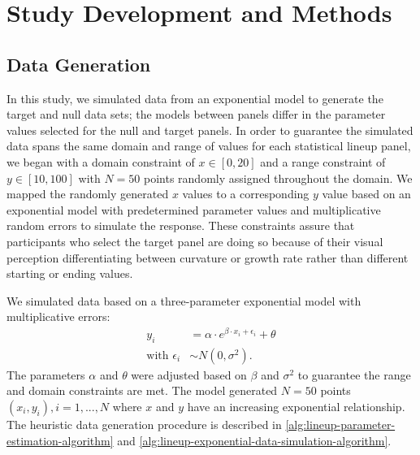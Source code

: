 \documentclass[12pt]{article}
\begin{document}
\hypertarget{methods}{%
\section{Study Development and Methods}\label{methods}}

\hypertarget{data-generation}{%
\subsection{Data Generation}\label{data-generation}}

In this study, we simulated data from an exponential model to generate
the target and null data sets; the models between panels differ in the
parameter values selected for the null and target panels. In order to
guarantee the simulated data spans the same domain and range of values
for each statistical lineup panel, we began with a domain constraint of
\(x\in [0,20]\) and a range constraint of \(y\in [10,100]\) with
\(N = 50\) points randomly assigned throughout the domain. We mapped the
randomly generated \(x\) values to a corresponding \(y\) value based on
an exponential model with predetermined parameter values and
multiplicative random errors to simulate the response. These constraints
assure that participants who select the target panel are doing so
because of their visual perception differentiating between curvature or
growth rate rather than different starting or ending values.

We simulated data based on a three-parameter exponential model with
multiplicative errors: \begin{align}
y_i & = \alpha\cdot e^{\beta\cdot x_i + \epsilon_i} + \theta \\
\text{with } \epsilon_i & \sim N(0, \sigma^2). \nonumber
\end{align} The parameters \(\alpha\) and \(\theta\) were adjusted based
on \(\beta\) and \(\sigma^2\) to guarantee the range and domain
constraints are met. The model generated \(N = 50\) points
\((x_i, y_i), i = 1,...,N\) where \(x\) and \(y\) have an increasing
exponential relationship. The heuristic data generation procedure is
described in \cref{alg:lineup-parameter-estimation-algorithm} and
\cref{alg:lineup-exponential-data-simulation-algorithm}.
\end{document}
